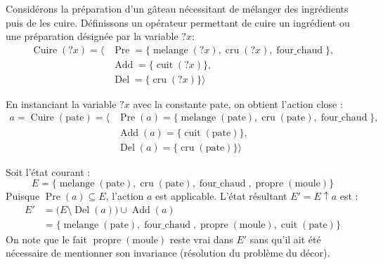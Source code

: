 \begin{example}
    Considérons la préparation d'un gâteau nécessitant de mélanger des ingrédients puis de les cuire.
    Définissons un opérateur permettant de cuire un ingrédient ou une préparation désignée par la variable $?x$:
    \begin{align*}
        \operatorname{Cuire}(?x) = \big\langle & \operatorname{Pre} = \{\operatorname{melange}(?x), \operatorname{cru}(?x), \operatorname{four\_chaud}\}, \\
        & \operatorname{Add} = \{\operatorname{cuit}(?x)\}, \\
        & \operatorname{Del} = \{\operatorname{cru}(?x)\} \big\rangle
    \end{align*}
    
    En instanciant la variable $?x$ avec la constante $\text{pate}$, on obtient l'action close :
    \begin{align*}
        a = \operatorname{Cuire}(\text{pate}) = \big\langle & \operatorname{Pre}(a) = \{\operatorname{melange}(\text{pate}), \operatorname{cru}(\text{pate}), \operatorname{four\_chaud}\}, \\
        & \operatorname{Add}(a) = \{\operatorname{cuit}(\text{pate})\}, \\
        & \operatorname{Del}(a) = \{\operatorname{cru}(\text{pate})\} \big\rangle
    \end{align*}

    Soit l'état courant :
    \begin{equation*}
        E = \{\operatorname{melange}(\text{pate}), \operatorname{cru}(\text{pate}), \operatorname{four\_chaud}, \operatorname{propre}(\text{moule})\}
    \end{equation*}
    Puisque $\operatorname{Pre}(a) \subseteq E$, l'action $a$ est applicable. L'état résultant $E' = E \mathbin{\uparrow} a$ est :
    \begin{align*}
        E' &= \bigl(E \setminus \operatorname{Del}(a)\bigr) \cup \operatorname{Add}(a) \\
        &= \{\operatorname{melange}(\text{pate}), \operatorname{four\_chaud}, \operatorname{propre}(\text{moule}), \operatorname{cuit}(\text{pate})\}
    \end{align*}
    On note que le fait $\operatorname{propre}(\text{moule})$ reste vrai dans $E'$ sans qu'il ait été nécessaire de mentionner son invariance (résolution du problème du décor).
\end{example}

